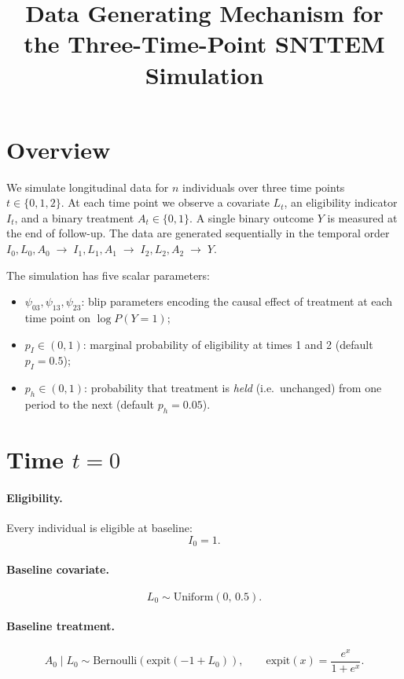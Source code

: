 \documentclass[12pt]{article}
\title{Data Generating Mechanism for the Three-Time-Point SNTTEM Simulation}
\date{}
\begin{document}
\maketitle

\section{Overview}

We simulate longitudinal data for $n$ individuals over three time points
$t \in \{0, 1, 2\}$.  At each time point we observe a covariate $L_t$, an
eligibility indicator $I_t$, and a binary treatment $A_t \in \{0,1\}$.  A
single binary outcome $Y$ is measured at the end of follow-up.  The data
are generated sequentially in the temporal order
$I_0, L_0, A_0 \;\to\; I_1, L_1, A_1 \;\to\; I_2, L_2, A_2 \;\to\; Y$.

The simulation has five scalar parameters:
\begin{itemize}
  \item $\psi_{03}, \psi_{13}, \psi_{23}$: blip parameters encoding the
        causal effect of treatment at each time point on $\log P(Y=1)$;
  \item $p_I \in (0,1)$: marginal probability of eligibility at times 1
        and 2 (default $p_I = 0.5$);
  \item $p_h \in (0,1)$: probability that treatment is \emph{held} (i.e.\
        unchanged) from one period to the next (default $p_h = 0.05$).
\end{itemize}

\section{Time $t = 0$}

\paragraph{Eligibility.}
Every individual is eligible at baseline:
\[
  I_0 = 1.
\]

\paragraph{Baseline covariate.}
\[
  L_0 \sim \mathrm{Uniform}(0,\, 0.5).
\]

\paragraph{Baseline treatment.}
\[
  A_0 \mid L_0 \sim \mathrm{Bernoulli}\!\left(\mathrm{expit}(-1 + L_0)\right),
  \qquad \mathrm{expit}(x) = \frac{e^x}{1+e^x}.
\]
\end{document}
